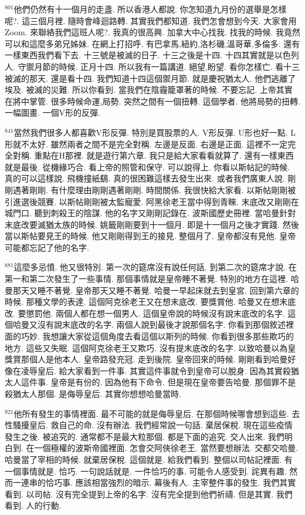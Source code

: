 \documentclass{book}
\begin{document}
$^{801}$他們仍然有十一個月的走盞.
所以香港人都說.
你怎知道九月份的選舉是怎樣呢?.
這三個月裡.
隨時會峰迴路轉.
其實我們都知道.
我們怎會想到今天.
大家會用Zoom.
來聯絡我們這班人呢?.
我真的很高興.
加拿大中心找我.
找我的時候.
我竟然可以和這麼多弟兄姊妹.
在網上打招呼.
有巴拿馬,紐約,洛杉磯,溫哥華,多倫多.
還有一樣東西我們看下去.
十三號是被滅的日子.
十三之後是十四.
十四其實就是以色列人.
守禦月節的時候.
正月十四.
所以我有一篇講道.
絕望,盼望.
看你怎樣亡.
看十三被滅的那天.
還是看十四.
我們知道十四這個禦月節.
就是慶祝猶太人.
他們逃離了埃及.
被滅的災難.
所以你看到.
當我們在陰霾籠罩著的時候.
不要忘記.
上帝其實在將中掌管.
很多時候命運,局勢.
突然之間有一個扭轉.
這個學者.
他將局勢的扭轉.
一幅圖畫.
一個V形的反彈.

$^{841}$當然我們很多人都喜歡V形反彈.
特別是買股票的人.
V形反彈.
U形也好一點.
L形就不太好.
雖然兩者之間不是完全對稱.
左邊是反面.
右邊是正面.
這裡不一定完全對稱.
重點在H那裡.
就是遊行第六章.
我只是給大家看看就算了.
還有一樣東西就是最後.
從機緣巧合.
看上帝的照管和保守.
可以說得上.
你看以斯帖記的時候.
真的可以這樣說.
飛機撞紙鷂.
真的很困難這樣去發生出來.
或者我們廣東人說.
剛剛遇著剛剛.
有什麼理由剛剛遇著剛剛.
時間關係.
我很快給大家看.
以斯帖剛剛被引進選後競賽.
以斯帖剛剛被太監寵愛.
阿黑徐老王當中得到青睞.
末底改又剛剛在城門口.
聽到刺殺王的陰謀.
他的名字又剛剛記錄在.
波斯國歷史冊裡.
當哈曼針對末底改要滅猶太族的時候.
姚籤剛剛要到十一個月.
即是十一個月之後才實踐.
然後當以斯帖要見王的時候.
他又剛剛得到王的接見.
整個月了.
皇帝都沒有見他.
皇帝可能都忘記了他的名字.

$^{881}$這麼多忌憤.
他又很特別.
第一次的筵席沒有說任何話.
到第二次的筵席才說.
在第一和第二次發生了一些事情.
那個事情就是皇帝睡不著覺.
特別的地方在這裡.
哈曼那天又睡不著覺.
皇帝那天又睡不著覺.
哈曼一早起床就去到皇宮.
回到第六章的時候.
那種文學的表達.
這個阿克徐老王又在想末底改.
要獎賞他.
哈曼又在想末底改.
要懲罰他.
兩個人都在想一個男人.
這個皇帝說的時候沒有說末底改的名字.
這個哈曼又沒有說末底改的名字.
兩個人說到最後才說那個名字.
你看到那個敘述裡面的巧妙.
我想讓大家從這個角度去看這個以斯列的時候.
你看到很多那些欺巧的地方.
這些又失眠.
這個阿克徐老王又欺巧.
沒有提末底改的名字.
以致哈曼以為皇獎賞那個人是他本人.
皇帝路發充冠.
走到後院.
皇帝回來的時候.
剛剛看到哈曼好像在凌辱皇后.
給大家看到一件事.
其實這件事就令到皇帝可以脫身.
因為其實殺猶太人這件事.
皇帝是有份的.
因為他有下命令.
但是現在皇帝要告哈曼.
那個罪不是殺猶太人那個.
是侮辱皇后.
其實你想想哈曼當時.

$^{921}$他所有發生的事情裡面.
最不可能的就是侮辱皇后.
在那個時候哪會想到這些.
去性騷擾皇后.
救自己的命.
沒有辦法.
我們經常說一句話.
棄居保稅.
現在這些疫情發生之後.
被追究的.
通常都不是最大粒那個.
都是下面的追究.
交人出來.
我們明白到.
在一個極權的波斯帝國裡面.
怎會交阿俠徐老王.
當然要想辦法.
交都交哈曼.
哈曼當了宰相的時候.
就棄居保稅.
這個就是.
給我們看到.
整個以司帖記裡面.
有一個事情就是.
恰巧.
一句說話就是.
一件恰巧的事.
可能令人感受到.
詫異有趣.
然而一連串的恰巧事.
應該相當強烈的暗示.
幕後有人.
主宰整件事的發生.
我們其實看到.
以司帖.
沒有完全提到上帝的名字.
沒有完全提到他們祈禱.
但是其實.
我們看到.
人的行動.
\end{document}
